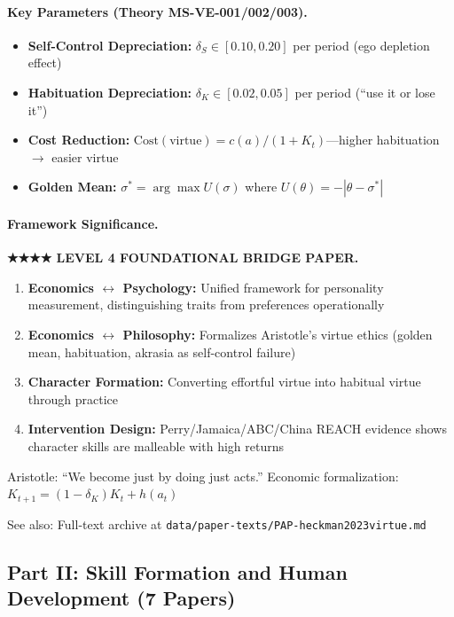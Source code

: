 \paragraph{Key Parameters (Theory MS-VE-001/002/003).}
\begin{itemize}
  \item \textbf{Self-Control Depreciation:} $\delta_S \in [0.10, 0.20]$ per period (ego
        depletion effect)
  \item \textbf{Habituation Depreciation:} $\delta_K \in [0.02, 0.05]$ per period (``use
        it or lose it'')
  \item \textbf{Cost Reduction:} $\text{Cost}(\text{virtue}) = c(a)/(1 + K_t)$---higher
        habituation $\to$ easier virtue
  \item \textbf{Golden Mean:} $\sigma^* = \arg\max U(\sigma)$ where $U(\theta) = -|\theta - \sigma^*|$
\end{itemize}

\paragraph{Framework Significance.}
\textbf{★★★★ LEVEL 4 FOUNDATIONAL BRIDGE PAPER.}
\begin{enumerate}
  \item \textbf{Economics $\leftrightarrow$ Psychology:} Unified framework for personality
        measurement, distinguishing traits from preferences operationally
  \item \textbf{Economics $\leftrightarrow$ Philosophy:} Formalizes Aristotle's virtue
        ethics (golden mean, habituation, akrasia as self-control failure)
  \item \textbf{Character Formation:} Converting effortful virtue into habitual virtue
        through practice
  \item \textbf{Intervention Design:} Perry/Jamaica/ABC/China REACH evidence shows
        character skills are malleable with high returns
\end{enumerate}

Aristotle: ``We become just by doing just acts.'' Economic formalization: $K_{t+1} = (1-\delta_K)K_t + h(a_t)$

See also: Full-text archive at \texttt{data/paper-texts/PAP-heckman2023virtue.md}

\subsection{Part II: Skill Formation and Human Development (7 Papers)}


